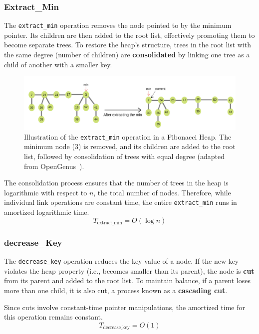 \documentclass[acmsmall]{acmart}
\begin{document}
\subsubsection*{Extract\_Min}
The \texttt{extract\_min} operation removes the node pointed to by the minimum pointer. Its children are then added to the root list, effectively promoting them to become separate trees. To restore the heap’s structure, trees in the root list with the same degree (number of children) are \textbf{consolidated} by linking one tree as a child of another with a smaller key.  

\begin{figure}[H]
  \centering
  \includegraphics[width=0.95\linewidth]{figs/fibonacci_heap2.png}
  \caption{Illustration of the \texttt{extract\_min} operation in a Fibonacci Heap. 
  The minimum node (3) is removed, and its children are added to the root list, followed by consolidation of trees with equal degree 
  (adapted from OpenGenus~\cite{opengenus_fibonacciheap}).}
  \label{fig:fibonacciheap_extractmin}
\end{figure}

The consolidation process ensures that the number of trees in the heap is logarithmic with respect to $n$, the total number of nodes. Therefore, while individual link operations are constant time, the entire \texttt{extract\_min} runs in amortized logarithmic time.  
\[
T_{\text{extract\_min}} = O(\log n)
\]

\subsubsection*{decrease\_Key}
The \texttt{decrease\_key} operation reduces the key value of a node. If the new key violates the heap property (i.e., becomes smaller than its parent), the node is \textbf{cut} from its parent and added to the root list.  
To maintain balance, if a parent loses more than one child, it is also cut, a process known as a \textbf{cascading cut}.  

Since cuts involve constant-time pointer manipulations, the amortized time for this operation remains constant.  
\[
T_{\text{decrease\_key}} = O(1)
\]
\end{document}
